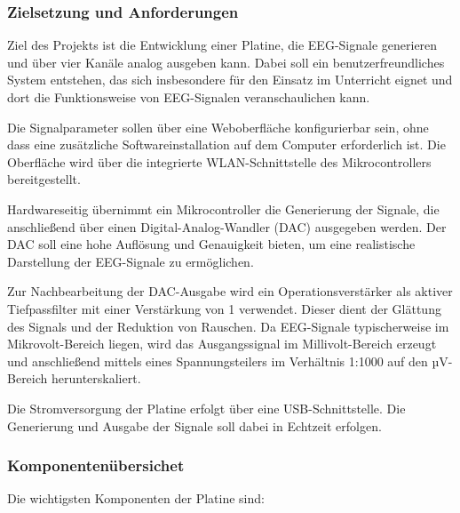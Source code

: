 \subsubsection{Zielsetzung und Anforderungen}

Ziel des Projekts ist die Entwicklung einer Platine, die EEG-Signale generieren und über vier Kanäle analog ausgeben kann. Dabei soll ein benutzerfreundliches System entstehen, das sich insbesondere für den Einsatz im Unterricht eignet und dort die Funktionsweise von EEG-Signalen veranschaulichen kann.

Die Signalparameter sollen über eine Weboberfläche konfigurierbar sein, ohne dass eine zusätzliche Softwareinstallation auf dem Computer erforderlich ist. Die Oberfläche wird über die integrierte WLAN-Schnittstelle des Mikrocontrollers bereitgestellt.

Hardwareseitig übernimmt ein Mikrocontroller die Generierung der Signale, die anschließend über einen Digital-Analog-Wandler (DAC) ausgegeben werden. Der DAC soll eine hohe Auflösung und Genauigkeit bieten, um eine realistische Darstellung der EEG-Signale zu ermöglichen.

Zur Nachbearbeitung der DAC-Ausgabe wird ein Operationsverstärker als aktiver Tiefpassfilter mit einer Verstärkung von 1 verwendet. Dieser dient der Glättung des Signals und der Reduktion von Rauschen. Da EEG-Signale typischerweise im Mikrovolt-Bereich liegen, wird das Ausgangssignal im Millivolt-Bereich erzeugt und anschließend mittels eines Spannungsteilers im Verhältnis 1:1000 auf den µV-Bereich herunterskaliert.

Die Stromversorgung der Platine erfolgt über eine USB-Schnittstelle. Die Generierung und Ausgabe der Signale soll dabei in Echtzeit erfolgen.



\subsubsection{Komponentenübersichet}

Die wichtigsten Komponenten der Platine sind:

